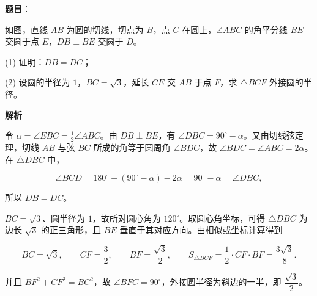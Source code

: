 \begin{answer}

\textbf{题目}：

如图，直线 $AB$ 为圆的切线，切点为 $B$，点 $C$ 在圆上，$\angle ABC$ 的角平分线 $BE$ 交圆于点 $E$，$DB\perp BE$ 交圆于 $D$。
\nopagebreak[4]
\begin{center}\end{center}
\nopagebreak[4]
(1) 证明：$DB=DC$；

(2) 设圆的半径为 $1$，$BC=\sqrt3$，延长 $CE$ 交 $AB$ 于点 $F$，求 $\triangle BCF$ 外接圆的半径。

\textbf{解析}


令 $\alpha=\angle EBC=\tfrac12\angle ABC$。由 $DB\perp BE$，有 $\angle DBC=90^\circ-\alpha$。又由切线弦定理，切线 $AB$ 与弦 $BC$ 所成的角等于圆周角 $\angle BDC$，故 $\angle BDC=\angle ABC=2\alpha$。在 $\triangle DBC$ 中，

\nopagebreak[4]
\[
\angle BCD=180^\circ-(90^\circ-\alpha)-2\alpha=90^\circ-\alpha=\angle DBC,
\]

所以 $DB=DC$。


$BC=\sqrt3$、圆半径为 $1$，故所对圆心角为 $120^\circ$。取圆心角坐标，可得 $\triangle DBC$ 为边长 $\sqrt3$ 的正三角形，且 $BE$ 垂直于其对应方向。由相似或坐标计算得到

\nopagebreak[4]
\[
BC=\sqrt3,\qquad CF=\frac32,\qquad BF=\frac{\sqrt3}{2},\qquad
S_{\triangle BCF}=\frac12\cdot CF\cdot BF=\frac{3\sqrt3}{8}.
\]

并且 $BF^2+CF^2=BC^2$，故 $\angle BFC=90^\circ$，外接圆半径为斜边的一半，即 $\dfrac{\sqrt3}{2}$。



\end{answer}
